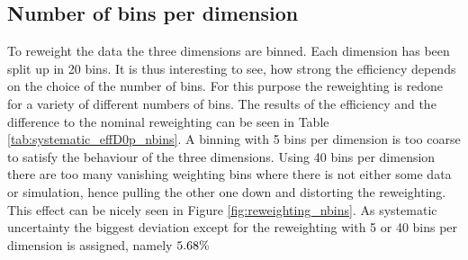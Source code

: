 \subsection{Number of bins per dimension}
To reweight the data the three dimensions are binned.
Each dimension has been split up in 20 bins.
It is thus interesting to see, how strong the efficiency depends on the choice of the number of bins.
For this purpose the reweighting is redone for a variety of different numbers of bins.
The results of the efficiency \effDp and the difference to the nominal reweighting can be seen in Table \ref{tab:systematic_effD0p_nbins}.
A binning with 5 bins per dimension is too coarse to satisfy the behaviour of the three dimensions.
Using 40 bins per dimension there are too many vanishing weighting bins where there is not either some data or simulation, hence pulling the other one down and distorting the reweighting.
This effect can be nicely seen in Figure \ref{fig:reweighting_nbins}.
As systematic uncertainty the biggest deviation except for the reweighting with 5 or 40 bins per dimension is assigned, namely $5.68\%$

